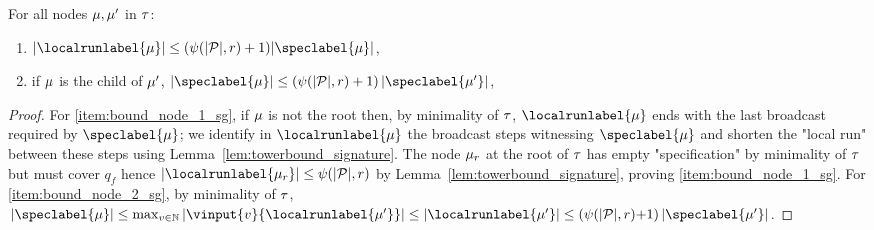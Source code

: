 \begin{lemma}
\label{lem:bounds_tree_sg}
For all nodes $\mu, \mu'$ in $\tau$: \begin{enumerate}
\item \label{item:bound_node_1_sg} $\size{\localrunlabel{\node}} \leq (\towerfun(\size{\prot}, r)+1) \size{\speclabel{\node}}$,
\item \label{item:bound_node_2_sg} if $\mu$ is the child of $\mu'$, $\size{\speclabel{\node}} \leq (\towerfun(\size{\prot}, r)+1) \, \size{\speclabel{\node'}}$,
\end{enumerate} 
\end{lemma}
\begin{proof}
For \ref{item:bound_node_1_sg}, if $\mu$ is not the root then, by minimality of $\tau$, $\localrunlabel{\node}$ ends with the last broadcast required by $\speclabel{\node}$; we identify in $\localrunlabel{\node}$ the broadcast steps witnessing $\speclabel{\node}$ and shorten the "local run" between these steps using Lemma~\ref{lem:towerbound_signature}.  The node $\mu_r$ at the root of $\tau$ has empty "specification" by minimality of $\tau$ but must cover $q_f$ hence $\size{\localrunlabel{\node_r}} \leq \towerfun(\size{\prot},r)$ by Lemma~\ref{lem:towerbound_signature}, proving \ref{item:bound_node_1_sg}.
For \ref{item:bound_node_2_sg}, by minimality of $\tau$, $\size{\speclabel{\node}} \leq \max_{v \in \nats} \size{\vinput{v}{\localrunlabel{\node'}}} \leq \size{\localrunlabel{\node'}} \leq (\towerfun(\size{\prot}, r){+}1) \, \size{\speclabel{\node'}}$. 
\end{proof}


